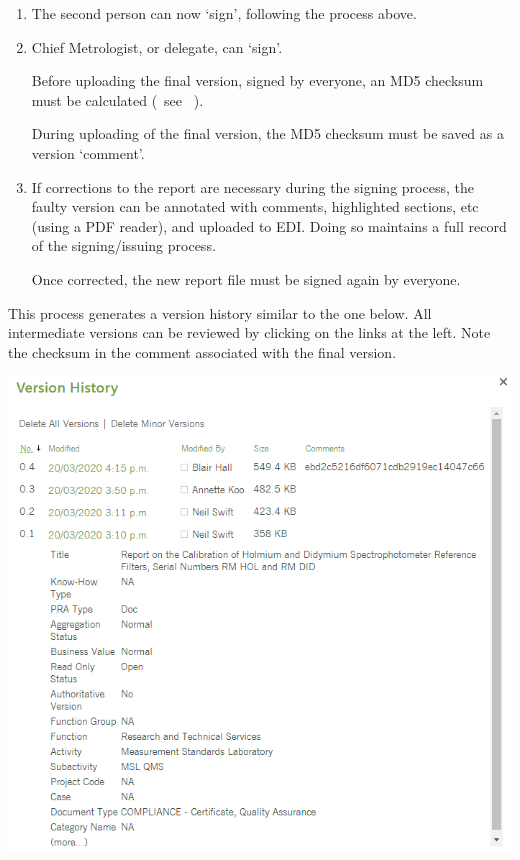 \begin{enumerate}
\item The second person can now `sign', following the process above.
\item Chief Metrologist, or delegate, can `sign'. 

Before uploading the final version, signed by everyone, an MD5 checksum must be calculated (~see \cite[\S\ref*{GRP-ss:file_integrity_md5}]{MSL_Reporting_Guidelines}~). 

During uploading of the final version, the MD5 checksum must be saved as a version `comment'. 

\item If corrections to the report are necessary during the signing process, the faulty version can be annotated with comments, highlighted sections, etc (using a PDF reader), and uploaded to EDI. Doing so maintains a full record of the signing/issuing process. 

Once corrected, the new report file must be signed again by everyone.
\end{enumerate}

This process generates a version history similar to the one below. All intermediate versions can be reviewed by clicking on the links at the left. Note the checksum in the comment associated with the final version.

\begin{center}
\includegraphics[scale=.6]{pictures/version_history_report}
\end{center}

